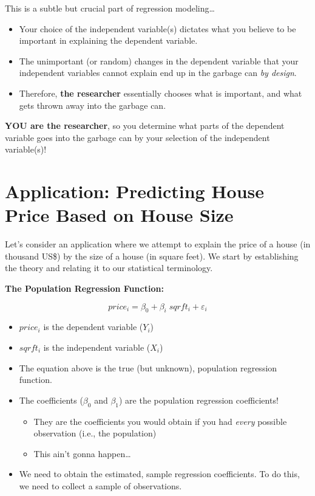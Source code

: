 \documentclass[
]{book}
\begin{document}
This is a subtle but crucial part of regression modeling\ldots{}

\begin{itemize}
\item
  Your choice of the independent variable(s) dictates what you believe to be important in explaining the dependent variable.
\item
  The unimportant (or random) changes in the dependent variable that your independent variables cannot explain end up in the garbage can \emph{by design}.
\item
  Therefore, \textbf{the researcher} essentially chooses what is important, and what gets thrown away into the garbage can.
\end{itemize}

\textbf{YOU are the researcher}, so you determine what parts of the dependent variable goes into the garbage can by your selection of the independent variable(s)!

\section{Application: Predicting House Price Based on House Size}\label{application-predicting-house-price-based-on-house-size}

Let's consider an application where we attempt to explain the price of a house (in thousand US\$) by the size of a house (in square feet). We start by establishing the theory and relating it to our statistical terminology.

\textbf{The Population Regression Function:}

\[price_i = \beta_0 + \beta_i \; sqrft_i + \varepsilon_i\]

\begin{itemize}
\item
  \(price_i\) is the dependent variable (\(Y_i\))
\item
  \(sqrft_i\) is the independent variable (\(X_i\))
\item
  The equation above is the true (but unknown), population regression function.
\item
  The coefficients (\(\beta_0\) and \(\beta_1\)) are the population regression coefficients!

  \begin{itemize}
  \item
    They are the coefficients you would obtain if you had \emph{every} possible observation (i.e., the population)
  \item
    This ain't gonna happen\ldots{}
  \end{itemize}
\item
  We need to obtain the estimated, sample regression coefficients. To do this, we need to collect a sample of observations.
\end{itemize}
\end{document}
